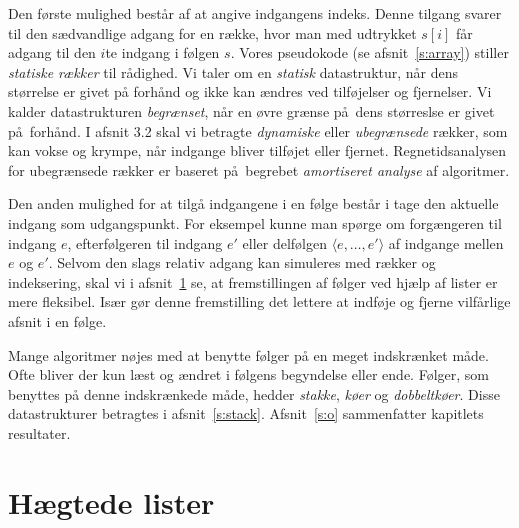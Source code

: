 Den første mulighed består af at angive indgangens indeks.
Denne tilgang svarer til den sædvandlige adgang for en række,
hvor man med udtrykket $s[i]$ får adgang til den $i$te indgang i følgen $s$.
Vores pseudokode (se afsnit~\ref{s:array}) stiller \emph{statiske rækker} til rådighed.
Vi taler om en \emph{statisk} datastruktur, når dens størrelse er givet på forhånd og ikke kan ændres ved tilføjelser og fjernelser.
Vi kalder datastrukturen \emph{begrænset},
  når en øvre grænse på dens størreslse er givet på forhånd.
I afsnit 3.2 skal vi betragte \emph{dynamiske} eller \emph{ubegrænsede} rækker,
som kan vokse og krympe, når indgange bliver tilføjet eller fjernet.
Regnetidsanalysen for ubegrænsede rækker er baseret på begrebet \emph{amortiseret analyse} af algoritmer.

Den anden mulighed for at tilgå indgangene i en følge består i tage den aktuelle indgang som udgangspunkt.
For eksempel kunne man spørge om forgængeren til indgang $e$,
efterfølgeren til indgang $e'$ 
eller delfølgen $\langle e,\ldots, e'\rangle$ af indgange mellen $e$ og $e'$.
Selvom den slags relativ adgang kan simuleres med rækker og indeksering, skal vi i afsnit~\ref{s:list} se, at fremstillingen af følger ved hjælp af lister er mere fleksibel.
Især gør denne fremstilling det lettere at indføje
og fjerne
vilfårlige afsnit i en følge.

Mange algoritmer nøjes med at benytte følger på en meget indskrænket måde.
Ofte bliver der kun læst og ændret i følgens begyndelse eller ende.
Følger, som benyttes på denne indskrænkede måde, hedder \emph{stakke}, \emph{køer} og \emph{dobbeltkøer}.
Disse datastrukturer betragtes i afsnit~\ref{s:stack}.
Afsnit~\ref{s:o} sammenfatter kapitlets resultater.

\section{Hægtede lister}
\label{s:list}


\newcommand{\friListe}{\Id{friListe}}

